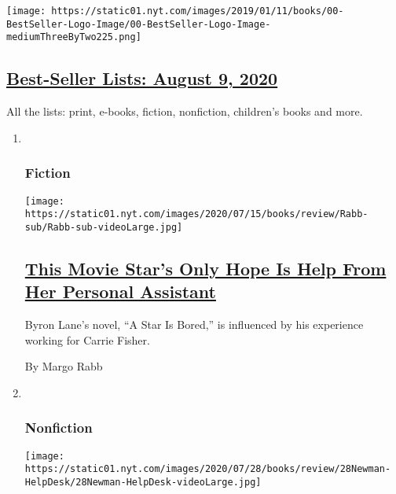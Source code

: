 \begin{enumerate}
  \texttt{[image: https://static01.nyt.com/images/2019/01/11/books/00-BestSeller-Logo-Image/00-BestSeller-Logo-Image-mediumThreeByTwo225.png]}

  \hypertarget{best-seller-lists-august-9-2020}{%
  \subsection{\texorpdfstring{\href{/interactive/2020/01/29/books/review/best-sellers-promo-for-front-copy2.html}{Best-Seller
  Lists: August 9,
  2020}}{Best-Seller Lists: August 9, 2020}}\label{best-seller-lists-august-9-2020}}

  All the lists: print, e-books, fiction, nonfiction, children's books
  and more.
\end{enumerate}

\begin{enumerate}
\def\labelenumi{\arabic{enumi}.}
\item ~
  \hypertarget{fiction-1}{%
  \subsubsection{Fiction}\label{fiction-1}}

  \texttt{[image: https://static01.nyt.com/images/2020/07/15/books/review/Rabb-sub/Rabb-sub-videoLarge.jpg]}

  \hypertarget{this-movie-stars-only-hope-is-help-from-her-personal-assistant}{%
  \subsection{\texorpdfstring{\href{/2020/07/28/books/review/a-star-is-bored-byron-lane.html}{This
  Movie Star's Only Hope Is Help From Her Personal
  Assistant}}{This Movie Star's Only Hope Is Help From Her Personal Assistant}}\label{this-movie-stars-only-hope-is-help-from-her-personal-assistant}}

  Byron Lane's novel, ``A Star Is Bored,'' is influenced by his
  experience working for Carrie Fisher.

  By Margo Rabb
\item ~
  \hypertarget{nonfiction-3}{%
  \subsubsection{Nonfiction}\label{nonfiction-3}}

  \texttt{[image: https://static01.nyt.com/images/2020/07/28/books/review/28Newman-HelpDesk/28Newman-HelpDesk-videoLarge.jpg]}


\end{enumerate}
